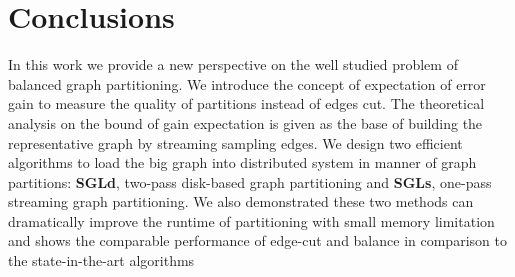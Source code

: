 \documentclass{sig-alternate-2013}
\begin{document}
\section{Conclusions}
In this work we provide a new perspective on the well studied problem of balanced graph partitioning. We introduce the concept of expectation of error gain to measure the quality of partitions instead of edges cut. The theoretical analysis on the bound of gain expectation is given as the base of building the representative graph by streaming sampling edges.  We design two efficient algorithms to load the big graph into distributed system in manner of graph partitions: \textbf{SGLd}, two-pass disk-based graph partitioning and \textbf{SGLs}, one-pass streaming graph partitioning. We also demonstrated these two methods can dramatically improve the runtime of partitioning with small memory limitation and shows the comparable performance of edge-cut and balance in comparison to the state-in-the-art algorithms


\balancecolumns
\end{document}
